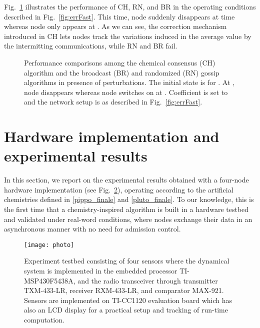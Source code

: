 \documentclass[journal]{IEEEtran}
\begin{document}
{Fig.~\ref{fig:onoffComp} illustrates the performance of CH, RN, and BR in the operating conditions described in Fig.~\ref{fig:errFast}. This time, node  suddenly disappears at time  whereas node  only appears at . As we can see, the correction mechanism introduced in CH lets nodes track the variations induced in the average value by the intermitting communications, while RN and BR fail.
} 





\begin{figure}[t]
 \centering
\caption{{Performance comparisons among the chemical consensus (CH) algorithm and the broadcast (BR) and randomized (RN) gossip algorithms in presence of perturbations. The initial state is  for . At , node  disappears whereas node  switches on at . Coefficient  is set to  and the network setup is as described in Fig.~\ref{fig:errFast}.}}
\label{fig:onoffComp}
\end{figure}










\section{Hardware implementation and experimental results}\label{sec:HWimpl}
{In this section, we report on the experimental results obtained with a four-node hardware implementation (see Fig.~\ref{fig:photo}), operating according to the artificial chemistries defined in \eqref{pippo_finale} and \eqref{pluto_finale}. To our knowledge, this is the first time that a chemistry-inspired algorithm is built in a hardware testbed and validated under real-word conditions, where nodes exchange their data in an asynchronous manner with no need for admission control. }

\begin{figure}[t]
\centering
\centerline{\texttt{[image: photo]}}
\caption{Experiment testbed consisting of four sensors where the dynamical system is implemented in the embedded processor TI-MSP430F5438A, and the radio transceiver through transmitter TXM-433-LR, receiver RXM-433-LR, and comparator MAX-921. Sensors are implemented on TI-CC1120 evaluation board which has also an LCD display for a practical setup and tracking of run-time computation.}
\label{fig:photo}
\end{figure}
\end{document}
